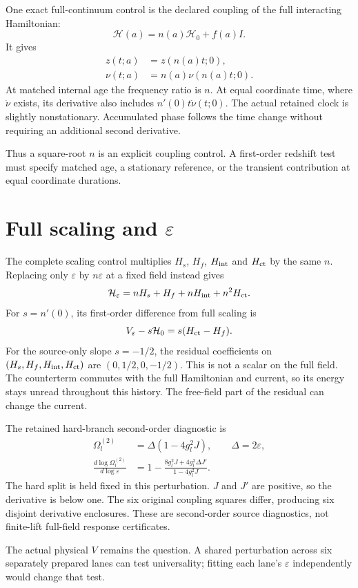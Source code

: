 \documentclass[10pt,twocolumn,letterpaper]{article}
\begin{document}
One exact full-continuum control is the declared coupling of the full interacting Hamiltonian:
\[
\mathcal H(a)=n(a)\mathcal H_0+f(a)I.
\]
It gives
\[
\begin{aligned}
z(t;a)&=z(n(a)t;0),\\
\nu(t;a)&=n(a)\nu(n(a)t;0).
\end{aligned}
\]
At matched internal age the frequency ratio is $n$. At equal coordinate time, where $\dot\nu$ exists, its derivative also includes $n'(0)t\dot\nu(t;0)$. The actual retained clock is slightly nonstationary. Accumulated phase follows the time change without requiring an additional second derivative.

Thus a square-root $n$ is an explicit coupling control. A first-order redshift test must specify matched age, a stationary reference, or the transient contribution at equal coordinate durations.

\section{Full scaling and \texorpdfstring{$\varepsilon$}{epsilon}}
The complete scaling control multiplies $H_s$, $H_f$, $H_{\rm int}$ and $H_{\rm ct}$ by the same $n$. Replacing only $\varepsilon$ by $n\varepsilon$ at a fixed field instead gives
\[
\mathcal H_\varepsilon=nH_s+H_f+nH_{\rm int}+n^2H_{\rm ct}.
\]
For $s=n'(0)$, its first-order difference from full scaling is
\[
V_\varepsilon-s\mathcal H_0=s(H_{\rm ct}-H_f).
\]
For the source-only slope $s=-1/2$, the residual coefficients on $(H_s,H_f,H_{\rm int},H_{\rm ct})$ are $(0,1/2,0,-1/2)$. This is not a scalar on the full field. The counterterm commutes with the full Hamiltonian and current, so its energy stays unread throughout this history. The free-field part of the residual can change the current.

The retained hard-branch second-order diagnostic is
\[
\begin{aligned}
\Omega_l^{(2)}&=\Delta(1-4g_l^2J),\qquad\Delta=2\varepsilon,\\
\frac{d\log\Omega_l^{(2)}}{d\log\varepsilon}
&=1-\frac{8g_l^2J+4g_l^2\Delta J'}{1-4g_l^2J}.
\end{aligned}
\]
The hard split is held fixed in this perturbation. $J$ and $J'$ are positive, so the derivative is below one. The six original coupling squares differ, producing six disjoint derivative enclosures. These are second-order source diagnostics, not finite-lift full-field response certificates.

The actual physical $V$ remains the question. A shared perturbation across six separately prepared lanes can test universality; fitting each lane's $\varepsilon$ independently would change that test.
\end{document}

